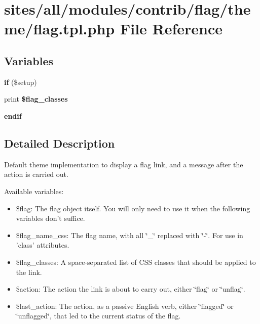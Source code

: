 \hypertarget{flag_8tpl_8php}{
\section{sites/all/modules/contrib/flag/theme/flag.tpl.php File Reference}
\label{flag_8tpl_8php}
}
\subsection*{Variables}
\begin{CompactItemize}
\item 
\hypertarget{flag_8tpl_8php_7a128587f14428e42a27f740b0dfebe3}{
\textbf{if} (\$setup)}
\label{flag_8tpl_8php_7a128587f14428e42a27f740b0dfebe3}

\item 
\hypertarget{flag_8tpl_8php_c87b6fdf78a54e6aa689bb4a219157a1}{
print \textbf{\$flag\_\-classes}}
\label{flag_8tpl_8php_c87b6fdf78a54e6aa689bb4a219157a1}

\item 
\hypertarget{flag_8tpl_8php_82cd33ca97ff99f2fcc5e9c81d65251b}{
\textbf{endif}}
\label{flag_8tpl_8php_82cd33ca97ff99f2fcc5e9c81d65251b}

\end{CompactItemize}


\subsection{Detailed Description}
Default theme implementation to display a flag link, and a message after the action is carried out.

Available variables:

\begin{itemize}
\item \$flag: The flag object itself. You will only need to use it when the following variables don't suffice.\item \$flag\_\-name\_\-css: The flag name, with all \char`\"{}\_\-\char`\"{} replaced with \char`\"{}-\char`\"{}. For use in 'class' attributes.\item \$flag\_\-classes: A space-separated list of CSS classes that should be applied to the link.\end{itemize}


\begin{itemize}
\item \$action: The action the link is about to carry out, either \char`\"{}flag\char`\"{} or \char`\"{}unflag\char`\"{}.\item \$last\_\-action: The action, as a passive English verb, either \char`\"{}flagged\char`\"{} or \char`\"{}unflagged\char`\"{}, that led to the current status of the flag.\end{itemize}


